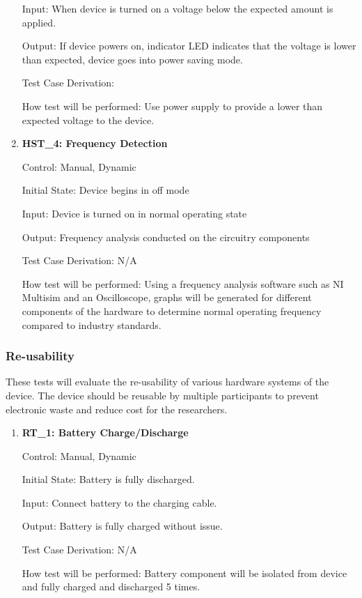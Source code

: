 \documentclass[12pt, titlepage]{article}
\begin{document}
\begin{enumerate}
Input: When device is turned on a voltage below the expected amount is applied.

Output: If device powers on, indicator LED indicates that the voltage is lower than expected, device goes into power saving mode.

Test Case Derivation:

How test will be performed: Use power supply to provide a lower than expected voltage to the device.

\item{\textbf{HST\_4: Frequency Detection}}\label{HST4}

Control: Manual, Dynamic

Initial State: Device begins in off mode

Input: Device is turned on in normal operating state

Output: Frequency analysis conducted on the circuitry components

Test Case Derivation: N/A

How test will be performed: Using a frequency analysis software such as NI Multisim and an Oscilloscope, graphs will be generated for different components of the hardware to determine normal operating frequency compared to industry standards.

\end{enumerate}

\subsubsection{Re-usability}

These tests will evaluate the re-usability of various hardware systems of the device. The device should be reusable by multiple participants to prevent electronic waste and reduce cost for the researchers. 

\begin{enumerate}


\item{\textbf{RT\_1: Battery Charge/Discharge}}\label{RT1}

Control: Manual, Dynamic

Initial State: Battery is fully discharged.

Input: Connect battery to the charging cable.

Output: Battery is fully charged without issue.

Test Case Derivation: N/A

How test will be performed: Battery component will be isolated from device and fully charged and discharged 5 times.

\end{enumerate}
\end{document}
